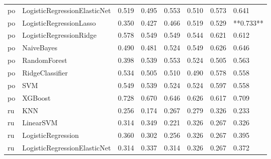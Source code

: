 \begin{tabular}{llllllll}
      po & LogisticRegressionElasticNet &     0.519 &                     0.495 &                 0.553 &                  0.510 &                                   0.573 &     0.641 \\
      po &      LogisticRegressionLasso &     0.350 &                     0.427 &                 0.466 &                  0.519 &                                   0.529 & **0.733** \\
      po &      LogisticRegressionRidge &     0.578 &                     0.549 &                 0.549 &                  0.544 &                                   0.621 &     0.612 \\
      po &                   NaiveBayes &     0.490 &                     0.481 &                 0.524 &                  0.549 &                                   0.626 &     0.646 \\
      po &                 RandomForest &     0.398 &                     0.539 &                 0.553 &                  0.524 &                                   0.505 &     0.563 \\
      po &              RidgeClassifier &     0.534 &                     0.505 &                 0.510 &                  0.490 &                                   0.578 &     0.558 \\
      po &                          SVM &     0.549 &                     0.539 &                 0.524 &                  0.524 &                                   0.597 &     0.558 \\
      po &                      XGBoost &     0.728 &                     0.670 &                 0.646 &                  0.626 &                                   0.617 &     0.709 \\
      ru &                          KNN &     0.256 &                     0.174 &                 0.267 &                  0.279 &                                   0.326 &     0.233 \\
      ru &                    LinearSVM &     0.314 &                     0.349 &                 0.221 &                  0.326 &                                   0.267 &     0.326 \\
      ru &           LogisticRegression &     0.360 &                     0.302 &                 0.256 &                  0.326 &                                   0.267 &     0.395 \\
      ru & LogisticRegressionElasticNet &     0.314 &                     0.337 &                 0.314 &                  0.326 &                                   0.267 &     0.372 \\

\end{tabular}
